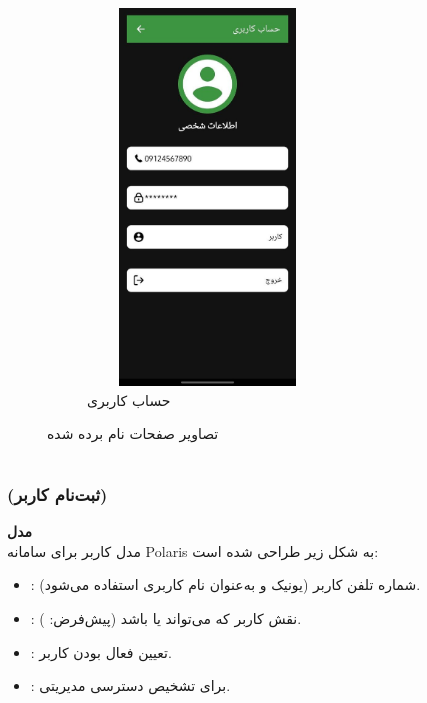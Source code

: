 \documentclass{report}
\begin{document}
\begin{figure}[ht]
\begin{subfigure}[b]{0.3\textwidth}
		\includegraphics[width=0.7\textwidth,height=10cm,keepaspectratio]{Pic/profile}
		\caption{حساب کاربری}
		\label{fig:signup}
	\end{subfigure}
	\caption{تصاویر صفحات نام برده شده}
	\label{fig:androidPages}
\end{figure}


\chapter{ }

\section{}

\subsection{ (ثبت‌نام کاربر)}
\textbf{مدل } \\
مدل کاربر برای سامانه Polaris به شکل زیر طراحی شده است:

\begin{itemize}
  \item {}: شماره تلفن کاربر (یونیک و به‌عنوان نام کاربری استفاده می‌شود).
  \item {}: نقش کاربر که می‌تواند  یا  باشد (پیش‌فرض: ).
  \item {}: تعیین فعال بودن کاربر.
  \item {}: برای تشخیص دسترسی مدیریتی.
\end{itemize}
\end{document}
